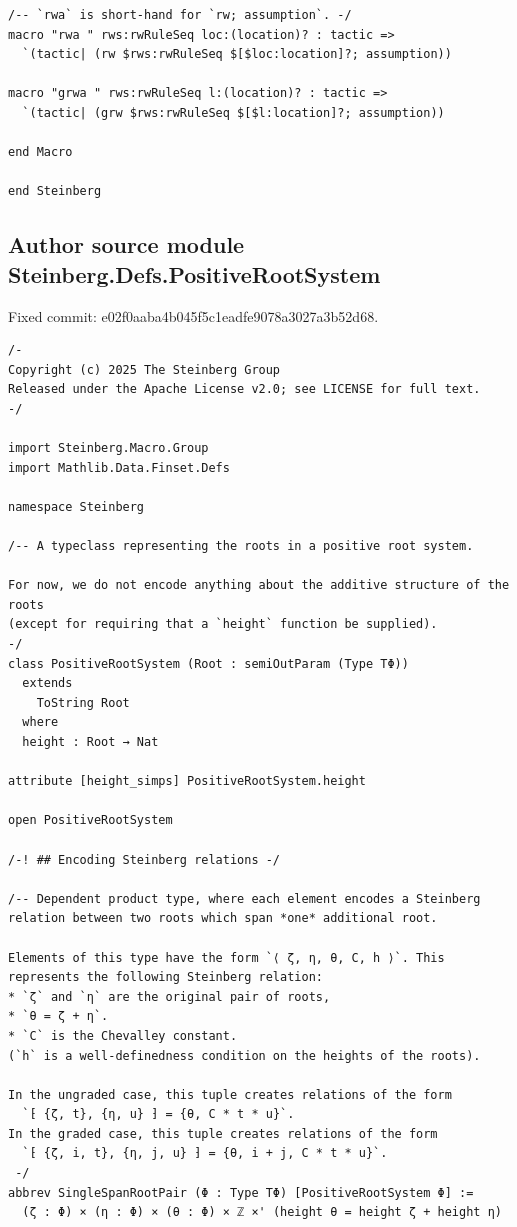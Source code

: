 \documentclass[10pt,a4paper]{article}
\begin{document}
\begin{Verbatim}
/-- `rwa` is short-hand for `rw; assumption`. -/
macro "rwa " rws:rwRuleSeq loc:(location)? : tactic =>
  `(tactic| (rw $rws:rwRuleSeq $[$loc:location]?; assumption))

macro "grwa " rws:rwRuleSeq l:(location)? : tactic =>
  `(tactic| (grw $rws:rwRuleSeq $[$l:location]?; assumption))

end Macro

end Steinberg
\end{Verbatim}

\subsection*{Author source module Steinberg.Defs.PositiveRootSystem}
\noindent Fixed commit: e02f0aaba4b045f5c1eadfe9078a3027a3b52d68.
\begin{Verbatim}
/-
Copyright (c) 2025 The Steinberg Group
Released under the Apache License v2.0; see LICENSE for full text.
-/

import Steinberg.Macro.Group
import Mathlib.Data.Finset.Defs

namespace Steinberg

/-- A typeclass representing the roots in a positive root system.

For now, we do not encode anything about the additive structure of the roots
(except for requiring that a `height` function be supplied).
-/
class PositiveRootSystem (Root : semiOutParam (Type TΦ))
  extends
    ToString Root
  where
  height : Root → Nat

attribute [height_simps] PositiveRootSystem.height

open PositiveRootSystem

/-! ## Encoding Steinberg relations -/

/-- Dependent product type, where each element encodes a Steinberg relation between two roots which span *one* additional root.

Elements of this type have the form `⟨ ζ, η, θ, C, h ⟩`. This represents the following Steinberg relation:
* `ζ` and `η` are the original pair of roots,
* `θ = ζ + η`.
* `C` is the Chevalley constant.
(`h` is a well-definedness condition on the heights of the roots).

In the ungraded case, this tuple creates relations of the form
  `⁅ {ζ, t}, {η, u} ⁆ = {θ, C * t * u}`.
In the graded case, this tuple creates relations of the form
  `⁅ {ζ, i, t}, {η, j, u} ⁆ = {θ, i + j, C * t * u}`.
 -/
abbrev SingleSpanRootPair (Φ : Type TΦ) [PositiveRootSystem Φ] :=
  (ζ : Φ) × (η : Φ) × (θ : Φ) × ℤ ×' (height θ = height ζ + height η)


\end{Verbatim}
\end{document}
